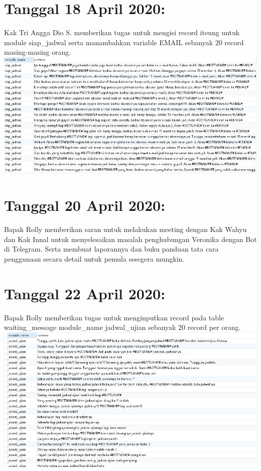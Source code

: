 \documentclass{article}
\begin{document}
\section{Tanggal 18 April 2020:}
Kak Tri Angga Dio S. memberikan tugas untuk mengisi record iteung untuk module siap\_jadwal serta manambahkan variable EMAIL sebanyak 20 record masing-masing orang.
	\newline
	\includegraphics[scale=0.5]{1.jpg}
	\newline

\section{Tanggal 20 April 2020:}
Bapak Rolly memberikan saran untuk melakukan meeting dengan Kak Wahyu dan Kak Innal untuk menyelesaikan masalah penghubungan Veronika dengan Bot di Telegram. Serta membuat laporannya dan buku panduan tata cara penggunaan secara detail untuk pemula sesegera mungkin.
	\newline
	\newline

\section{Tanggal 22 April 2020:}
Bapak Rolly memberikan tugas untuk menginputkan record pada table waiting\_message module\_name jadwal\_ujian sebanyak 20 record per orang.
	\newline
	\includegraphics[scale=0.5]{2.jpg}
	\newline
\end{document}
